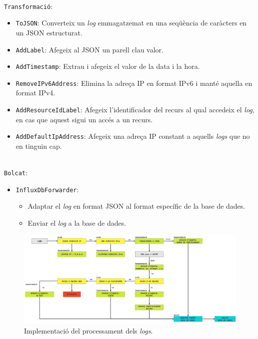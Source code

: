 \noindent \\
\texttt{Transformació}:
\begin{itemize}
    \item \texttt{ToJSON}: Converteix un \textit{log} emmagatzemat en una seqüència de caràcters en un \gls{JSON} estructurat.
    \item \texttt{AddLabel}: Afegeix al JSON un parell clau valor.
    \item \texttt{AddTimestamp}: Extrau i afegeix el valor de la data i la hora.
    \item \texttt{RemoveIPv6Address}: Elimina la adreça \gls{IP} en format IPv6 i manté aquella en format IPv4.
    \item \texttt{AddResourceIdLabel}: Afegeix l'identificador del recurs al qual accedeix el \textit{log}, en cas que aquest sigui un accés a un recurs.
    \item \texttt{AddDefaultIpAddress}: Afegeix una adreça \gls{IP} constant a aquells \textit{logs} que no en tinguin cap.
\end{itemize}

\noindent \\
\texttt{Bolcat}:
\begin{itemize}
    \item \texttt{InfluxDbForwarder}:
    \begin{itemize}
        \item Adaptar el \textit{log} en format JSON al format específic de la base de dades.
        \item Enviar el \textit{log} a la base de dades.
    \end{itemize}
\end{itemize}

\clearpage

\begin{figure}[htbp]
    \centerline{\includegraphics[width=1.2\textwidth]{figures/log-processing-workflow}}
    \captionsetup{justification=centering}
    \caption{Implementació del processament dels \textit{logs}.}\label{fig:log-processing-workflow}
\end{figure}